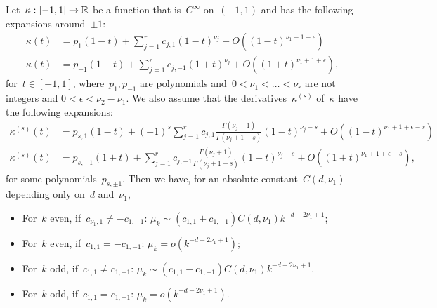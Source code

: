 \begin{theorem}
\label{thm:decay_full}
Let~$\kappa: [-1,1] \to {\mathbb R}$ be a function that is~$C^\infty$ on~$(-1,1)$ and has the following expansions around~$\pm 1$:
\begin{align}
\kappa(t) &= p_1(1-t) + \sum_{j=1}^r c_{j,1} (1-t)^{\nu_j} + O((1-t)^{\nu_1 + 1 + \epsilon}) \\
\kappa(t) &= p_{-1}(1+t) + \sum_{j=1}^r c_{j,-1} (1+t)^{\nu_j} + O((1+t)^{\nu_1 + 1 + \epsilon}),
\end{align}
for~$t \in [-1, 1]$, where~$p_1, p_{-1}$ are polynomials and~$0 < \nu_1 < \ldots < \nu_r$ are not integers and $0 < \epsilon < \nu_2 - \nu_1$.
We also assume that the derivatives~$\kappa^{(s)}$ of~$\kappa$ have the following expansions:
\begin{align}
\kappa^{(s)}(t) &= p_{s,1}(1-t) + (-1)^s\sum_{j=1}^r c_{j,1} \frac{\Gamma(\nu_j + 1)}{\Gamma(\nu_j + 1 - s)} (1-t)^{\nu_j-s} + O((1-t)^{\nu_1 + 1 + \epsilon - s}) \\
\kappa^{(s)}(t) &= p_{s,-1}(1+t) + \sum_{j=1}^r c_{j,-1} \frac{\Gamma(\nu_j + 1)}{\Gamma(\nu_j + 1 - s)} (1+t)^{\nu_j-s} + O((1+t)^{\nu_1 + 1 + \epsilon - s}),
\end{align}
for some polynomials~$p_{s,\pm 1}$.
Then we have, for an absolute constant~$C(d,\nu_1)$ depending only on~$d$ and~$\nu_1$,
\begin{itemize}[noitemsep]
	\item For~$k$ even, if~$c_{\nu_1,1} \ne -c_{1,-1}$: $\mu_k \sim (c_{1,1} + c_{1,-1}) C(d,\nu_1) k^{-d-2 \nu_1 + 1}$;
	\item For~$k$ even, if~$c_{1,1} = -c_{1,-1}$: $\mu_k = o(k^{-d-2 \nu_1 + 1})$;
	\item For~$k$ odd, if~$c_{1,1} \ne c_{1,-1}$: $\mu_k \sim (c_{1,1} - c_{1,-1}) C(d,\nu_1) k^{-d-2 \nu_1 + 1}$.
	\item For~$k$ odd, if~$c_{1,1} = c_{1,-1}$: $\mu_k =o(k^{-d-2 \nu_1 + 1})$.
\end{itemize}
\end{theorem}

